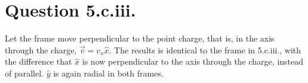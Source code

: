 \documentclass{article}
\begin{document}
\section*{Question 5.c.iii.}
Let the frame move perpendicular to the point charge, that is, in the axis through the charge, $\vec{v}=v_x\hat{x}$. The results is identical to the frame in 5.c.iii., with the difference that $\hat{x}$ is now perpendicular to the axis through the charge, instead of parallel. $\hat{y}$ is again radial in both frames.
\end{document}
